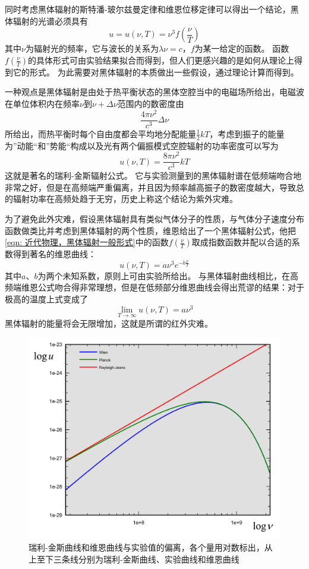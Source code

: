 同时考虑黑体辐射的斯特潘-玻尔兹曼定律和维恩位移定律可以得出一个结论，黑体辐射的光谱必须具有
\begin{equation}\label{eqn: 近代物理，黑体辐射一般形式}
u=u(\nu,T)= \nu^3f(\frac{\nu}{T})
\end{equation}
其中$\nu$为辐射光的频率，它与波长的关系为$\lambda\nu=c$，$f$为某一给定的函数。
函数$f(\frac{\nu}{T})$的具体形式可由实验结果拟合而得到，但人们更感兴趣的是如何从理论上得到它的形式。
为此需要对黑体辐射的本质做出一些假设，通过理论计算而得到。

一种观点是黑体辐射是由处于热平衡状态的黑体空腔当中的电磁场所给出，电磁波在单位体积内在频率$\nu$到$\nu+\Delta\nu$范围内的数密度由
\begin{equation}
\frac{4\pi\nu^2}{c^3}\Delta\nu
\end{equation}
所给出，而热平衡时每个自由度都会平均地分配能量$\frac{1}{2}kT$，考虑到振子的能量为”动能“和”势能“构成以及光有两个偏振模式空腔辐射的功率密度可以写为
\begin{equation}
u(\nu,T)=\frac{8\pi\nu^2}{c^3}kT
\end{equation}
这就是著名的瑞利-金斯辐射公式。
它与实验测量到的黑体辐射谱在低频端吻合地非常之好，但是在高频端严重偏离，并且因为频率越高振子的数密度越大，导致总的辐射功率在高频处趋于无穷，历史上称这个结论为紫外灾难。

为了避免此外灾难，假设黑体辐射具有类似气体分子的性质，与气体分子速度分布函数做类比并考虑到黑体辐射的两个性质，维恩给出了一个黑体辐射公式，他把\ref{eqn: 近代物理，黑体辐射一般形式}中的函数$f(\frac{\nu}{T})$取成指数函数并配以合适的系数得到著名的维恩曲线：
\begin{equation}
u(\nu,T)=a\nu^3e^{-b\frac{\nu}{T}}
\end{equation}
其中$a$、$b$为两个未知系数，原则上可由实验所给出。
与黑体辐射曲线相比，在高频端维恩公式吻合得非常理想，但是在低频部分维恩曲线会得出荒谬的结果：对于极高的温度上式变成了
\begin{equation}
\lim_{T\rightarrow\infty}u(\nu,T)=a\nu^3
\end{equation}
黑体辐射的能量将会无限增加，这就是所谓的红外灾难。
\begin{figure}
\centering
\includegraphics[width=0.6\linewidth]{images/particle-6}
\caption{瑞利-金斯曲线和维恩曲线与实验值的偏离，各个量用对数标出，从上至下三条线分别为瑞利-金斯曲线、实验曲线和维恩曲线}
\label{fig:particle-6}
\end{figure}

